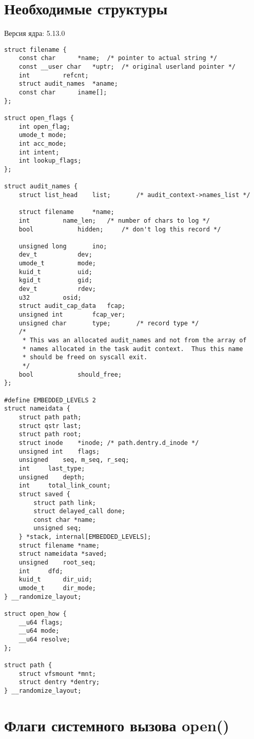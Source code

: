 \chapter{Необходимые структуры}

Версия ядра: 5.13.0

\begin{center}
    \captionsetup{justification=raggedright,singlelinecheck=off}
    \begin{lstlisting}
struct filename {
	const char		*name;	/* pointer to actual string */
	const __user char	*uptr;	/* original userland pointer */
	int			refcnt;
	struct audit_names	*aname;
	const char		iname[];
};

struct open_flags {
	int open_flag;
	umode_t mode;
	int acc_mode;
	int intent;
	int lookup_flags;
};

struct audit_names {
	struct list_head	list;		/* audit_context->names_list */

	struct filename		*name;
	int			name_len;	/* number of chars to log */
	bool			hidden;		/* don't log this record */

	unsigned long		ino;
	dev_t			dev;
	umode_t			mode;
	kuid_t			uid;
	kgid_t			gid;
	dev_t			rdev;
	u32			osid;
	struct audit_cap_data	fcap;
	unsigned int		fcap_ver;
	unsigned char		type;		/* record type */
	/*
	 * This was an allocated audit_names and not from the array of
	 * names allocated in the task audit context.  Thus this name
	 * should be freed on syscall exit.
	 */
	bool			should_free;
};

#define EMBEDDED_LEVELS 2
struct nameidata {
	struct path	path;
	struct qstr	last;
	struct path	root;
	struct inode	*inode; /* path.dentry.d_inode */
	unsigned int	flags;
	unsigned	seq, m_seq, r_seq;
	int		last_type;
	unsigned	depth;
	int		total_link_count;
	struct saved {
		struct path link;
		struct delayed_call done;
		const char *name;
		unsigned seq;
	} *stack, internal[EMBEDDED_LEVELS];
	struct filename	*name;
	struct nameidata *saved;
	unsigned	root_seq;
	int		dfd;
	kuid_t		dir_uid;
	umode_t		dir_mode;
} __randomize_layout;

struct open_how {
	__u64 flags;
	__u64 mode;
	__u64 resolve;
};

struct path {
	struct vfsmount *mnt;
	struct dentry *dentry;
} __randomize_layout;
\end{lstlisting}
\end{center}

\chapter{Флаги системного вызова open()}

